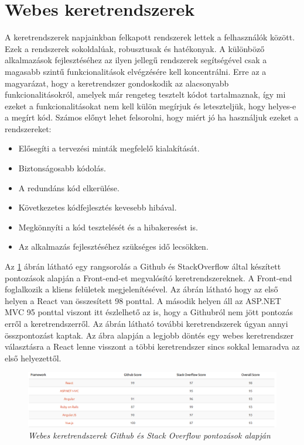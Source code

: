 \section{Webes keretrendszerek}
A keretrendszerek \cite{frameworks} napjainkban felkapott rendszerek lettek a felhasználók között. Ezek a rendszerek sokoldalúak, robusztusak és hatékonyak. A különböző alkalmazások fejlesztéséhez az ilyen jellegű rendszerek segítségével csak a magasabb szintű funkcionalitások elvégzésére kell koncentrálni. Erre az a magyarázat, hogy a keretrendszer gondoskodik az alacsonyabb funkcionalitásokról, amelyek már rengeteg tesztelt kódot tartalmaznak, így mi ezeket a funkcionalitásokat nem kell külön megírjuk és leteszteljük, hogy helyes-e a megírt kód. Számos előnyt lehet felsorolni, hogy miért jó ha használjuk ezeket a rendszereket:
\begin{itemize}
	\item Elősegíti a tervezési minták megfelelő kialakítását.
	\item Biztonságosabb kódolás.
	\item A redundáns kód elkerülése.
	\item Következetes kódfejlesztés kevesebb hibával.
	\item Megkönnyíti a kód tesztelését és a hibakeresést is.
	\item Az alkalmazás fejlesztéséhez szükséges idő lecsökken.
\end{itemize}

Az \ref{fig:fornt_frameworks} ábrán látható egy rangsorolás a Github és StackOverflow által készített pontozások alapján a Front-end-et megvalósító keretrendszereknek. A Front-end foglalkozik a kliens felületek megjelenítésével. Az ábrán látható hogy az első helyen a React van összesített 98 ponttal. A második helyen áll az ASP.NET MVC 95 ponttal viszont itt észlelhető az is, hogy a Githubról nem jött pontozás erről a keretrendszerről. Az ábrán látható további keretrendszerek úgyan annyi összpontozást kaptak. Az ábra alapján a legjobb döntés egy webes keretrendszer választásra a React lenne visszont a többi keretrendszer sincs sokkal lemaradva az első helyezettől.
\begin{figure}[H]
	\centering
	\includegraphics[width=1\linewidth]{figures/images/vueang.png}
	\caption[Webes keretrendszerek Github és Stack Overflow pontozások alapján]{\textit{Webes keretrendszerek Github és Stack Overflow pontozások alapján}\footnotemark}
	\label{fig:fornt_frameworks}
\end{figure}

